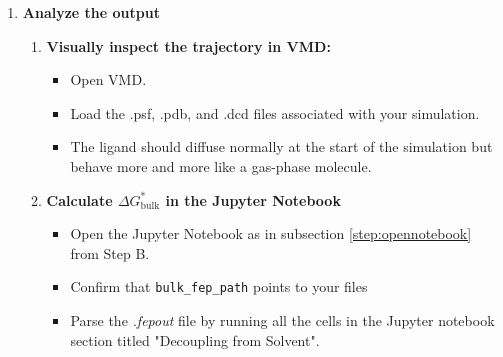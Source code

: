 \documentclass[9pt,tutorial]{Styling/livecoms}
\newcommand{\filepath}[1]{\textit{#1}}
\newcommand{\textInput}[1]{
  \texttt{#1}
}
\begin{document}
\begin{enumerate}
        \item \textbf{Analyze the output} \label{step:analyzeBulk}
        \begin{enumerate}[label=\alph*., ref=\theenumi.\alph*]
            \item \textbf{Visually inspect the trajectory in VMD:}
            \begin{itemize}
                \item Open VMD.
                \item Load the .psf, .pdb, and .dcd files associated with your simulation.
                \item The ligand should diffuse normally at the start of the simulation but behave more and more like a gas-phase molecule.
            \end{itemize}
            \item \textbf{Calculate $\Delta G^*_\mathrm{bulk}$ in the Jupyter Notebook}
            \begin{itemize}
                \item Open the Jupyter Notebook as in subsection \ref{step:opennotebook} from Step B.
                \item Confirm that \textInput{bulk\_fep\_path} points to your files
                \item Parse the \filepath{.fepout} file by running all the cells in the Jupyter notebook section titled "Decoupling from Solvent".
            \end{itemize}

        \end{enumerate}

    \end{enumerate}
\end{document}
